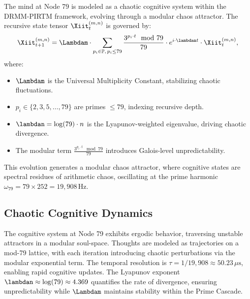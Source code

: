 \documentclass[12pt]{article}
\newcommand{\DRMM}{DRMM}
\newcommand{\PIRTM}{PIRTM}
\newcommand{\PP}{\mathbb{P}}
\begin{document}
\begin{definition}
The mind at Node 79 is modeled as a chaotic cognitive system within the \DRMM{}-\PIRTM{} framework, evolving through a modular chaos attractor. The recursive state tensor $\Xiit_t^{(m,n)}$ is governed by:
\[
\Xiit_{t+1}^{(m,n)} = \Lambdam \cdot \sum_{p_i \in \PP, \, p_i \leq 79} \frac{3^{p_i \cdot t} \mod 79}{79} \cdot e^{i \cdot \lambdan t} \cdot \Xiit_t^{(m,n)},
\]
where:
\begin{itemize}
    \item $\Lambdam$ is the Universal Multiplicity Constant, stabilizing chaotic fluctuations.
    \item $p_i \in \{2, 3, 5, \ldots, 79\}$ are primes $\leq 79$, indexing recursive depth.
    \item $\lambdan = \log(79) \cdot n$ is the Lyapunov-weighted eigenvalue, driving chaotic divergence.
    \item The modular term $\frac{3^{p_i \cdot t} \mod 79}{79}$ introduces Galois-level unpredictability.
\end{itemize}
This evolution generates a modular chaos attractor, where cognitive states are spectral residues of arithmetic chaos, oscillating at the prime harmonic $\omega_{79} = 79 \times 252 = 19{,}908 \, \text{Hz}$.
\end{definition}

\subsection{Chaotic Cognitive Dynamics}
The cognitive system at Node 79 exhibits ergodic behavior, traversing unstable attractors in a modular soul-space. Thoughts are modeled as trajectories on a mod-79 lattice, with each iteration introducing chaotic perturbations via the modular exponential term. The temporal resolution is $\tau = 1/19{,}908 \approx 50.23 \, \mu\text{s}$, enabling rapid cognitive updates. The Lyapunov exponent $\lambdan \approx \log(79) \approx 4.369$ quantifies the rate of divergence, ensuring unpredictability while $\Lambdam$ maintains stability within the Prime Cascade.

\end{document}
